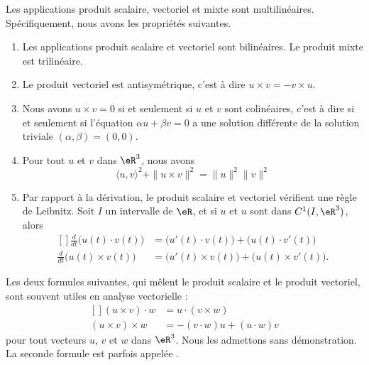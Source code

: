 \begin{proposition}		 \label{PropScalMixtLin}
	Les applications produit scalaire, vectoriel et mixte sont multilinéaires. Spécifiquement, nous avons les propriétés suivantes.
	\begin{enumerate}
		\item
			Les applications produit scalaire et vectoriel sont bilinéaires. Le produit mixte est trilinéaire.
		\item
			Le produit vectoriel est antisymétrique, c'est à dire $u\times v=-v\times u$.
		\item
			Nous avons $u\times v=0$ si et seulement si $u$ et $v$ sont colinéaires, c'est à dire si et seulement si l'équation $\alpha u+\beta v=0$ a une solution différente de la solution triviale $(\alpha,\beta)=(0,0)$.
		\item		\label{ItemPropScalMixtLiniv}
			Pour tout $u$ et $v$ dans $\eR^3$, nous avons
			\begin{equation}
				\langle u, v\rangle^2 +\| u\times v \|^2=\| u \|^2\| v \|^2
			\end{equation}
		\item
			Par rapport à la dérivation, le produit scalaire et vectoriel vérifient une règle de Leibnitz. Soit $I$ un intervalle de $\eR$, et si $u$ et $u$ sont dans $C^1(I,\eR^3)$, alors
			\begin{equation}		\label{EqFormLeibProdscalVect}
				\begin{aligned}[]
					\frac{ d }{ dt }\big( u(t)\cdot v(t) \big)&=\big( u'(t)\cdot v(t) \big)+\big( u(t)\cdot v'(t) \big)\\
					\frac{ d }{ dt }\big( u(t)\times v(t) \big)&=\big( u'(t)\times v(t) \big)+\big( u(t)\times v'(t) \big).
				\end{aligned}
			\end{equation}
		\end{enumerate}
\end{proposition}

Les deux formules suivantes, qui mêlent le produit scalaire et le produit vectoriel, sont souvent utiles en analyse vectorielle :
\begin{equation}
	\begin{aligned}[]
		(u\times v)\cdot w&=u\cdot(v\times w)\\
		(u\times v)\times w&=-(v\cdot w)u+(u\cdot w)v		\label{EqFormExpluxxx}
	\end{aligned}
\end{equation}
pour tout vecteurs $u$, $v$ et $w$ dans $\eR^3$. Nous les admettons sans démonstration. La seconde formule est parfois appelée .




